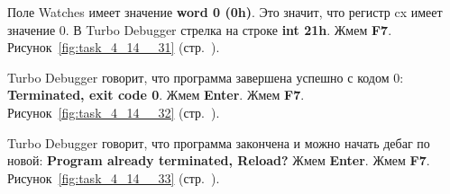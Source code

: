 Поле Watches имеет значение \textbf{word 0 (0h)}.
Это значит, что регистр cx имеет значение 0.
В Turbo Debugger стрелка на строке \textbf{int 21h}.
Жмем \textbf{F7}.
Рисунок~\ref{fig:task_4_14__31} (стр.~\pageref{fig:task_4_14__31}).

Turbo Debugger говорит, что программа завершена успешно с кодом 0:
\textbf{Terminated, exit code 0}.
Жмем \textbf{Enter}.
Жмем \textbf{F7}.
Рисунок~\ref{fig:task_4_14__32} (стр.~\pageref{fig:task_4_14__32}).

Turbo Debugger говорит, что программа закончена и можно начать дебаг по новой:
\textbf{Program already terminated, Reload?}
Жмем \textbf{Enter}.
Жмем \textbf{F7}.
Рисунок~\ref{fig:task_4_14__33} (стр.~\pageref{fig:task_4_14__33}).

\newpage
